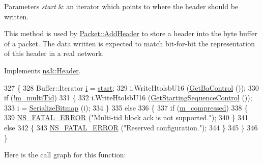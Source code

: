\begin{DoxyParams}{Parameters}
{\em start} & an iterator which points to where the header should be written.\\
\hline
\end{DoxyParams}
This method is used by \hyperlink{classns3_1_1Packet_a465108c595a0bc592095cbcab1832ed8}{Packet\+::\+Add\+Header} to store a header into the byte buffer of a packet. The data written is expected to match bit-\/for-\/bit the representation of this header in a real network. 

Implements \hyperlink{classns3_1_1Header_afb61f1aac69ff8349a6bfe521fab5404}{ns3\+::\+Header}.


\begin{DoxyCode}
327 \{
328   Buffer::Iterator \hyperlink{bernuolliDistribution_8m_a6f6ccfcf58b31cb6412107d9d5281426}{i} = \hyperlink{namespacevisualizer_1_1core_a2a35e5d8a34af358b508dac8635754e0}{start};
329   i.WriteHtolsbU16 (\hyperlink{classns3_1_1CtrlBAckResponseHeader_ab5a98cc153aa142f62df571caa792a58}{GetBaControl} ());
330   \textcolor{keywordflow}{if} (!\hyperlink{classns3_1_1CtrlBAckResponseHeader_ab3b2b175ee54daa240e3cc0450c5812e}{m\_multiTid})
331     \{
332       i.WriteHtolsbU16 (\hyperlink{classns3_1_1CtrlBAckResponseHeader_a61d0ad6be50188f337d24d7a7ce274be}{GetStartingSequenceControl} ());
333       i = \hyperlink{classns3_1_1CtrlBAckResponseHeader_a11654e2bf8bcfe2381a57082fb696368}{SerializeBitmap} (i);
334     \}
335   \textcolor{keywordflow}{else}
336     \{
337       \textcolor{keywordflow}{if} (\hyperlink{classns3_1_1CtrlBAckResponseHeader_a7d33c0c452139f1d9f110dab89bfcef7}{m\_compressed})
338         \{
339           \hyperlink{group__fatal_ga5131d5e3f75d7d4cbfd706ac456fdc85}{NS\_FATAL\_ERROR} (\textcolor{stringliteral}{"Multi-tid block ack is not supported."});
340         \}
341       \textcolor{keywordflow}{else}
342         \{
343           \hyperlink{group__fatal_ga5131d5e3f75d7d4cbfd706ac456fdc85}{NS\_FATAL\_ERROR} (\textcolor{stringliteral}{"Reserved configuration."});
344         \}
345     \}
346 \}
\end{DoxyCode}


Here is the call graph for this function\+:


